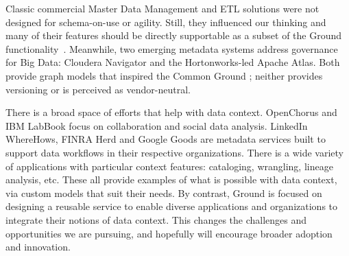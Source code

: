 \documentclass{sig-alternate}
\begin{document}
Classic commercial Master Data Management and ETL solutions were not designed for 
schema-on-use or agility. 
Still, they influenced our thinking and many of their features should be directly supportable as a subset of the Ground functionality~\cite{loshin2010master}.
Meanwhile,
two emerging metadata systems address governance for Big Data: Cloudera Navigator and the Hortonworks-led Apache Atlas. 
Both provide graph models that inspired the Common Ground \mantle; neither provides versioning or is perceived as vendor-neutral. %

There is a broad space of efforts that help with data context. OpenChorus and IBM LabBook focus on collaboration and social data analysis.
LinkedIn WhereHows, FINRA Herd and Google Goods are metadata services built to support data workflows in their respective organizations.
There is a wide variety of applications with particular context features: cataloging, wrangling, lineage analysis, etc. These all provide examples of what is possible with data context, via custom models that suit their needs. By contrast, Ground is focused on designing a reusable service to enable diverse applications and organizations to integrate their notions 
of data context. 
This changes the challenges and opportunities we are pursuing, and hopefully will encourage broader adoption and innovation.


\end{document}
